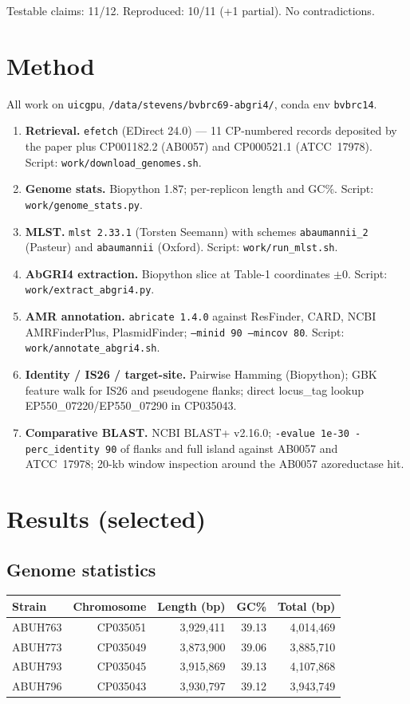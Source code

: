\documentclass[11pt]{article}
\begin{document}
Testable claims: 11/12. Reproduced: 10/11 (+1 partial). No contradictions.

\section{Method}
All work on \texttt{uicgpu}, \texttt{/data/stevens/bvbrc69-abgri4/}, conda env \texttt{bvbrc14}.

\begin{enumerate}[leftmargin=*]
\item \textbf{Retrieval.} \texttt{efetch} (EDirect 24.0) --- 11 CP-numbered records deposited by the paper plus CP001182.2 (AB0057) and CP000521.1 (ATCC~17978). Script: \texttt{work/download\_genomes.sh}.
\item \textbf{Genome stats.} Biopython 1.87; per-replicon length and GC\%. Script: \texttt{work/genome\_stats.py}.
\item \textbf{MLST.} \texttt{mlst 2.33.1} (Torsten Seemann) with schemes \texttt{abaumannii\_2} (Pasteur) and \texttt{abaumannii} (Oxford). Script: \texttt{work/run\_mlst.sh}.
\item \textbf{AbGRI4 extraction.} Biopython slice at Table-1 coordinates $\pm$0. Script: \texttt{work/extract\_abgri4.py}.
\item \textbf{AMR annotation.} \texttt{abricate 1.4.0} against ResFinder, CARD, NCBI AMRFinderPlus, PlasmidFinder; \texttt{--minid 90 --mincov 80}. Script: \texttt{work/annotate\_abgri4.sh}.
\item \textbf{Identity / IS26 / target-site.} Pairwise Hamming (Biopython); GBK feature walk for IS26 and pseudogene flanks; direct locus\_tag lookup EP550\_07220/EP550\_07290 in CP035043.
\item \textbf{Comparative BLAST.} NCBI BLAST+ v2.16.0; \texttt{-evalue 1e-30 -perc\_identity 90} of flanks and full island against AB0057 and ATCC~17978; 20-kb window inspection around the AB0057 azoreductase hit.
\end{enumerate}

\section{Results (selected)}

\subsection{Genome statistics}
\begin{tabular}{@{}lrrrr@{}}\toprule
Strain & Chromosome & Length (bp) & GC\% & Total (bp) \\ \midrule
ABUH763 & CP035051 & 3{,}929{,}411 & 39.13 & 4{,}014{,}469 \\
ABUH773 & CP035049 & 3{,}873{,}900 & 39.06 & 3{,}885{,}710 \\
ABUH793 & CP035045 & 3{,}915{,}869 & 39.13 & 4{,}107{,}868 \\
ABUH796 & CP035043 & 3{,}930{,}797 & 39.12 & 3{,}943{,}749 \\
\bottomrule
\end{tabular}
\end{document}
